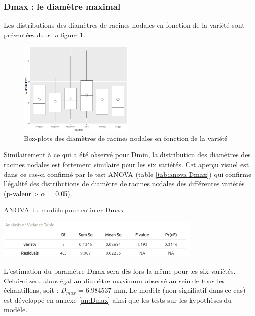 \subsubsection{Dmax : le diamètre maximal}

Les distributions des diamètres de racines nodales en fonction de la variété sont présentées dans la figure \ref{fig:boxplot Dmax}.

\begin{figure}[ht]
\centering
\includegraphics[width=0.5\textwidth]{Image/boxplot Dmax.png}
\caption{Box-plots des diamètres de racines nodales en fonction de la variété}
\label{fig:boxplot Dmax}
\end{figure}
\newpage

Similairement à ce qui a été observé pour Dmin, la distribution des diamètres des racines nodales est fortement similaire pour les six variétés.
Cet aperçu visuel est dans ce cas-ci confirmé par le test ANOVA (table \ref{tab:anova Dmax}) qui confirme l'égalité des distributions de diamètre de racines nodales des différentes variétés (p-valeur > $\alpha$ = 0.05).

\begin{table}[!ht]
    \centering
    \caption{ANOVA du modèle pour estimer Dmax}
    \includegraphics[width=0.75\textwidth]{Image/anova Dmax.png}
    \label{tab:anova Dmax}
\end{table}

L'estimation du paramètre Dmax sera dès lors la même pour les six variétés.
Celui-ci sera alors égal au diamètre maximum observé au sein de tous les échantillons, soit : $D_{max} = 6.984537$ mm.
Le modèle (non signifiatif dans ce cas) est développé en annexe \ref{an:Dmax} ainsi que les tests sur les hypothèses du modèle.

